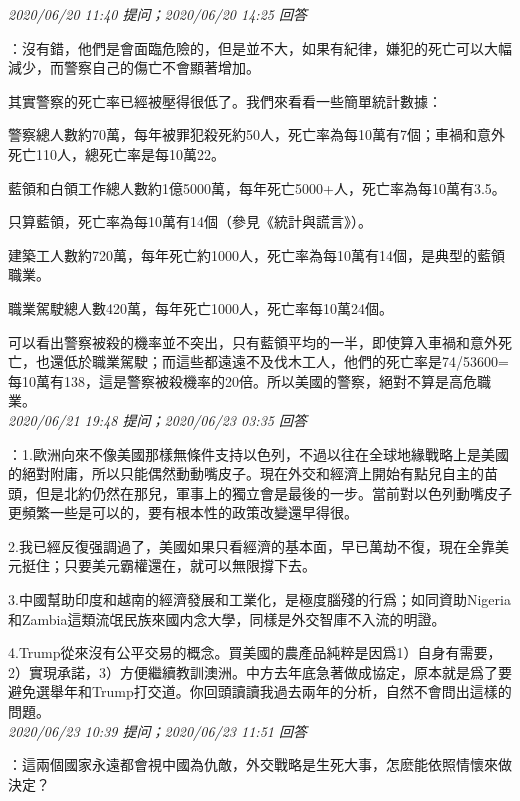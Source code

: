 \documentclass[twocolumn]{ctexart}
\begin{document}
\textit{\hfill\noindent\small 2020/06/20 11:40 提问；2020/06/20 14:25 回答}

：沒有錯，他們是會面臨危險的，但是並不大，如果有紀律，嫌犯的死亡可以大幅減少，而警察自己的傷亡不會顯著增加。

其實警察的死亡率已經被壓得很低了。我們來看看一些簡單統計數據：

警察總人數約70萬，每年被罪犯殺死約50人，死亡率為每10萬有7個；車禍和意外死亡110人，總死亡率是每10萬22。

藍領和白領工作總人數約1億5000萬，每年死亡5000+人，死亡率為每10萬有3.5。

只算藍領，死亡率為每10萬有14個（參見《統計與謊言》）。

建築工人數約720萬，每年死亡約1000人，死亡率為每10萬有14個，是典型的藍領職業。

職業駕駛總人數420萬，每年死亡1000人，死亡率每10萬24個。

可以看出警察被殺的機率並不突出，只有藍領平均的一半，即使算入車禍和意外死亡，也還低於職業駕駛；而這些都遠遠不及伐木工人，他們的死亡率是74/53600=每10萬有138，這是警察被殺機率的20倍。所以美國的警察，絕對不算是高危職業。
\\

\textit{\hfill\noindent\small 2020/06/21 19:48 提问；2020/06/23 03:35 回答}

：1.歐洲向來不像美國那樣無條件支持以色列，不過以往在全球地緣戰略上是美國的絕對附庸，所以只能偶然動動嘴皮子。現在外交和經濟上開始有點兒自主的苗頭，但是北約仍然在那兒，軍事上的獨立會是最後的一步。當前對以色列動嘴皮子更頻繁一些是可以的，要有根本性的政策改變還早得很。

2.我已經反復强調過了，美國如果只看經濟的基本面，早已萬劫不復，現在全靠美元挺住；只要美元霸權還在，就可以無限撐下去。

3.中國幫助印度和越南的經濟發展和工業化，是極度腦殘的行爲；如同資助Nigeria和Zambia這類流氓民族來國内念大學，同樣是外交智庫不入流的明證。

4.Trump從來沒有公平交易的概念。買美國的農產品純粹是因爲1）自身有需要，2）實現承諾，3）方便繼續教訓澳洲。中方去年底急著做成協定，原本就是爲了要避免選舉年和Trump打交道。你回頭讀讀我過去兩年的分析，自然不會問出這樣的問題。
\\

\textit{\hfill\noindent\small 2020/06/23 10:39 提问；2020/06/23 11:51 回答}

：這兩個國家永遠都會視中國為仇敵，外交戰略是生死大事，怎麽能依照情懷來做決定？
\end{document}
